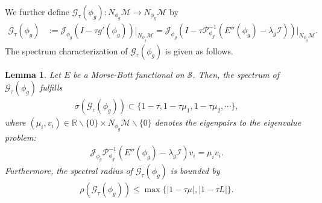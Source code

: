 \documentclass[preprint,3p]{elsarticle}
\newtheorem{lemma}{Lemma}[section]
\begin{document}
We further define \(\mathcal{G}_{\tau}(\phi_g): N_{\phi_g}\mathcal{M} \to N_{\phi_g}\mathcal{M}\) by
\begin{align*}
	\mathcal{G}_{\tau}(\phi_g) &:=\mathcal{J}_{\phi_g} \left(I - \tau g'(\phi_g)\right)\big|_{N_{\phi_g}\mathcal{M}}= \mathcal{J}_{\phi_g} \left(I - \tau\mathcal{P}^{-1}_{\phi_g} \left(E''(\phi_g) - \lambda_g \mathcal{I}\right)\right)\Big|_{N_{\phi_g}\mathcal{M}}.
\end{align*}
The spectrum characterization of $\mathcal{G}_{\tau}(\phi_g)$ is given as follows.
\begin{lemma}\label{G-spectrum}
	Let $E$ be a
	Morse-Bott functional on $\mathcal{S}$. Then, the spectrum of $\mathcal{G}_{\tau}(\phi_g)$ fulfills
	\begin{align*}
		\sigma\left(\mathcal{G}_{\tau}(\phi_g)\right)\subset\big\{1-\tau,1-\tau\mu_1,1-\tau\mu_2,\cdots\big\},
	\end{align*}
	where $(\mu_i,v_i)\in\mathbb{R}\backslash\{0\}\times N_{\phi_g}\mathcal{M}\backslash\{0\}$ denotes the eigenpairs to the eigenvalue problem:
	\begin{align*}
		\mathcal{J}_{\phi_g}\mathcal{P}^{-1}_{\phi_g} \left(E''(\phi_g) - \lambda_g \mathcal{I}\right)v_i=\mu_iv_i.
	\end{align*}
	Furthermore, the spectral radius of $\mathcal{G}_{\tau}(\phi_g)$ is bounded by
	\begin{align*}
		\rho\left(\mathcal{G}_{\tau}(\phi_g)\right) \le\max\big\{|1-\tau\mu|,|1-\tau L|\big\}.
	\end{align*}
\end{lemma}
\end{document}
